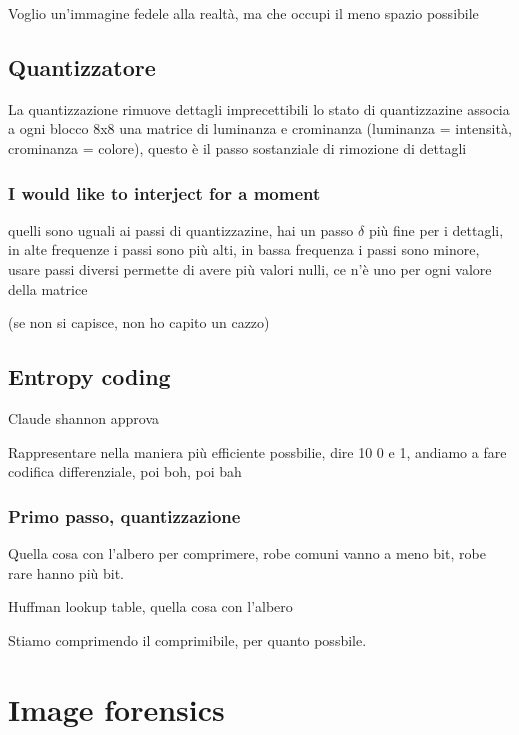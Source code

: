 \documentclass[11pt]{article}
\begin{document}
Voglio un'immagine fedele alla realtà, ma che occupi il meno spazio
possibile

\subsection{Quantizzatore}
\label{sec:orgfe8a205}

La quantizzazione rimuove dettagli imprecettibili
lo stato di quantizzazine associa a ogni blocco 8x8 una matrice di
luminanza e crominanza (luminanza = intensità, crominanza =
colore), questo è il passo sostanziale di rimozione di dettagli\par

\subsubsection{I would like to interject for a moment}
\label{sec:org1aed204}

quelli sono uguali ai passi di quantizzazine, hai un passo \(\delta\) più
fine per i dettagli, in alte frequenze i passi sono più alti, in bassa
frequenza i passi sono minore, usare passi diversi permette di avere
più valori nulli, ce n'è uno per ogni valore della matrice

(se non si capisce, non ho capito un cazzo)


\subsection{Entropy coding}
\label{sec:orgfaa7ebe}
Claude shannon approva\par

Rappresentare nella maniera più efficiente possbilie, dire 10 0 e 1,
andiamo a fare codifica differenziale, poi boh, poi bah

\subsubsection{Primo passo, quantizzazione}
\label{sec:orgac224a0}

Quella cosa con l'albero per comprimere, robe comuni vanno a meno bit,
robe rare hanno più bit.

Huffman lookup table, quella cosa con l'albero

Stiamo comprimendo il comprimibile, per quanto possbile.

\section{Image forensics}
\label{sec:orgad03c9a}
\end{document}
